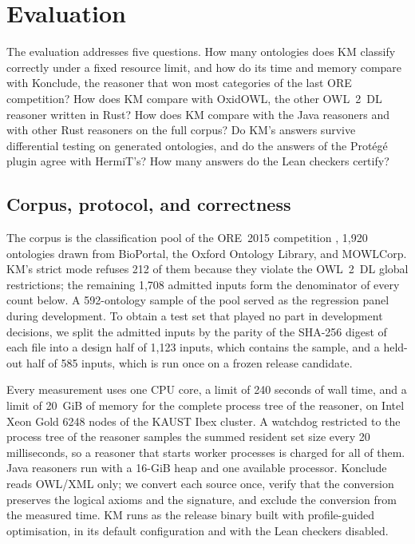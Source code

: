 \section{Evaluation}
\label{sec:evaluation}

The evaluation addresses five questions.  How many ontologies does KM
classify correctly under a fixed resource limit, and how do its time and
memory compare with Konclude, the reasoner that won most categories of the
last ORE competition?  How does KM compare with OxidOWL, the other OWL~2~DL
reasoner written in Rust?  How does KM compare with the Java reasoners and
with other Rust reasoners on the full corpus?  Do KM's answers survive
differential testing on generated ontologies, and do the answers of the
Prot\'eg\'e plugin agree with HermiT's?  How many answers do the Lean checkers
certify?

\subsection{Corpus, protocol, and correctness}
\label{sec:eval-protocol}

The corpus is the classification pool of the ORE~2015 competition
\cite{parsia2017ore2015,parsia2016oreresources}, 1,920 ontologies drawn from
BioPortal, the Oxford Ontology Library, and MOWLCorp.  KM's strict mode
refuses 212 of them because they violate the OWL~2~DL global restrictions;
the remaining 1,708 admitted inputs form the denominator of every count
below.  A 592-ontology sample of the pool served as the regression panel
during development.  To obtain a test set that played no part in development
decisions, we split the admitted inputs by the parity of the SHA-256 digest of
each file into a design half of 1,123 inputs, which contains the sample, and a
held-out half of 585 inputs, which is run once on a frozen release candidate.

Every measurement uses one CPU core, a limit of 240 seconds of wall time, and
a limit of 20~GiB of memory for the complete process tree of the reasoner, on
Intel Xeon Gold 6248 nodes of the KAUST Ibex cluster.  A watchdog restricted to
the process tree of the reasoner samples the summed resident set size every 20
milliseconds, so a reasoner that starts worker processes is charged for all of
them.  Java reasoners run with a 16-GiB heap and one available processor.
Konclude reads OWL/XML only; we convert each source once, verify that the
conversion preserves the logical axioms and the signature, and exclude the
conversion from the measured time.  KM runs as the release binary built with
profile-guided optimisation, in its default configuration and with the Lean
checkers disabled.

